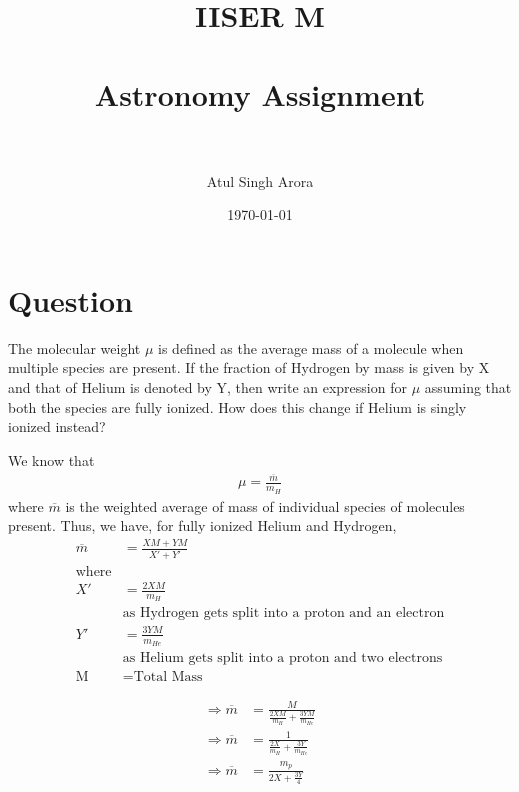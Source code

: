 \documentclass[paper=a4, fontsize=11pt]{scrartcl} %
\title{	
\normalfont \normalsize 
\textsc{IISER M} \\ [25pt] %
\horrule{0.5pt} \\[0.4cm] %
\huge Astronomy Assignment \\ %
\horrule{2pt} \\[0.5cm] %
}
\author{Atul Singh Arora} %
\date{\normalsize\today} %
\numberwithin{equation}{section} %
\numberwithin{figure}{section} %
\numberwithin{table}{section} %
\begin{document}
\maketitle %

\everymath{\displaystyle}


\section{Question}
	The molecular weight $\mu$ is defined as the average mass of a molecule when multiple species are present. If the fraction of Hydrogen by mass is given by X and that of Helium is denoted by Y, then write an expression for $\mu$ assuming that both the species are fully ionized. How does this change if Helium is singly ionized instead?\\
	\par
	We know that
	\begin{align}
		\mu=\frac{\overline{m}}{m_H}
	\end{align}
	where $\overline{m}$ is the weighted average of mass of individual species of molecules present. Thus, we have, for fully ionized Helium and Hydrogen,
	\begin{equation}
	\begin{split}
		\overline{m} & =\frac{XM + YM}{X'+Y'} \\
		\text{where}\\
		X' & = \frac{2XM}{m_H} \\
		& \text{as Hydrogen gets split into a proton and an electron} \\
		Y' & =\frac{3YM}{m_{He}} \\
		& \text{as Helium gets split into a proton and two electrons} \\
		\text{M} &= \text{Total Mass}
	\end{split}
	\end{equation}

	\begin{equation}
	\begin{split}
		\Rightarrow \overline{m} & = \frac{M}{\frac{2XM}{m_H} + \frac{3YM}{m_{He}}} \\
		\Rightarrow \overline{m} & = \frac{1}{\frac{2X}{m_H} + \frac{3Y}{m_{He}}} \\
		\Rightarrow \overline{m} & = \frac{m_p}{2X + \frac{3Y}{4}}	
	\end{split}
	\end{equation}
\end{document}
